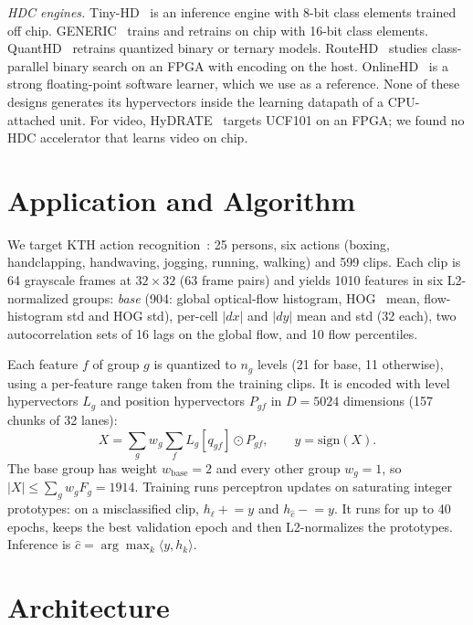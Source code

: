\documentclass[conference]{IEEEtran}
\begin{document}
\emph{HDC engines.} Tiny-HD~\cite{tinyhd} is an inference engine with 8-bit class elements trained off chip. GENERIC~\cite{generic} trains and retrains on chip with 16-bit class elements. QuantHD~\cite{quanthd} retrains quantized binary or ternary models. RouteHD~\cite{sahruri2026routehd} studies class-parallel binary search on an FPGA with encoding on the host. OnlineHD~\cite{onlinehd} is a strong floating-point software learner, which we use as a reference. None of these designs generates its hypervectors inside the learning datapath of a CPU-attached unit. For video, HyDRATE~\cite{hydrate2021} targets UCF101 on an FPGA; we found no HDC accelerator that learns video on chip.

\section{Application and Algorithm}
\label{sec:app}
We target KTH action recognition~\cite{schuldt2004}: 25 persons, six actions (boxing, handclapping, handwaving, jogging, running, walking) and 599 clips. Each clip is 64 grayscale frames at $32{\times}32$ (63 frame pairs) and yields 1010 features in six L2-normalized groups: \emph{base} (904: global optical-flow histogram, HOG~\cite{dalal2005} mean, flow-histogram std and HOG std), per-cell $|dx|$ and $|dy|$ mean and std (32 each), two autocorrelation sets of 16 lags on the global flow, and 10 flow percentiles.

Each feature $f$ of group $g$ is quantized to $n_g$ levels (21 for base, 11 otherwise), using a per-feature range taken from the training clips. It is encoded with level hypervectors $L_g$ and position hypervectors $P_{gf}$ in $D=5024$ dimensions (157 chunks of 32 lanes):
\begin{equation}
X=\sum_{g} w_g\sum_{f} L_g[q_{gf}]\odot P_{gf},\qquad y=\mathrm{sign}(X).
\label{eq:enc}
\end{equation}
The base group has weight $w_{\text{base}}=2$ and every other group $w_g=1$, so $|X|\le\sum_g w_g F_g=1914$. Training runs perceptron updates on saturating integer prototypes: on a misclassified clip, $h_{\ell}\mathrel{+}=y$ and $h_{\hat c}\mathrel{-}=y$. It runs for up to 40 epochs, keeps the best validation epoch and then L2-normalizes the prototypes. Inference is $\hat c=\arg\max_k\langle y,h_k\rangle$.

\section{Architecture}
\label{sec:arch}
\end{document}
